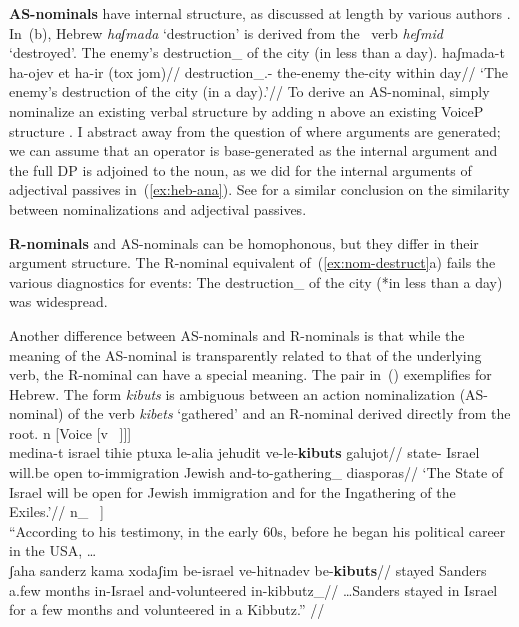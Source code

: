 \textbf{AS-nominals} have internal structure, as discussed at length by various authors \citep{chomsky70,grimshaw90,marantz97,harley09n,alexiadou10b,borer13oup}. In~(\nextx b), Hebrew \emph{haʃmada} `destruction' is derived from the \thif~verb \emph{heʃmid} `destroyed'.
\pex\label{ex:nom-destruct}
	\a The enemy's destruction_{} of the city (in less than a day).
	\a \begingl
		\gla haʃmada-t ha-ojev et ha-ir (tox jom)//
		\glb destruction_{}.- the-enemy  the-city within day//
		\glft `The enemy's destruction of the city (in a day).'//
	\endgl
\xe
To derive an AS-nominal, simply nominalize an existing verbal structure by adding n above an existing VoiceP structure \citep{hazout95,engelhardt00}. I abstract away from the question of where arguments are generated; we can assume that an operator is base-generated as the internal argument and the full DP is adjoined to the noun, as we did for the internal arguments of adjectival passives in~(\ref{ex:heb-ana}). See \citet[559]{borer13oup} for a similar conclusion on the similarity between nominalizations and adjectival passives.
\\
\xe

\textbf{R-nominals} and AS-nominals can be homophonous, but they differ in their argument structure. The R-nominal equivalent of~(\ref{ex:nom-destruct}a) fails the various diagnostics for events:
\ex The destruction_{} of the city (*in less than a day) was widespread.
\xe

Another difference between AS-nominals and R-nominals is that while the meaning of the AS-nominal is transparently related to that of the underlying verb, the R-nominal can have a special meaning. The pair in~(\nextx) exemplifies for Hebrew. The form \emph{kibuts} is ambiguous between an action nominalization (AS-nominal) of the verb \emph{kibets} `gathered' and an R-nominal derived directly from the root.
\pex
	\a {[}n [Voice {\va} [v ~\!]]]\\
	\begingl
		\gla medina-t israel tihie ptuxa le-alia jehudit ve-le-\textbf{kibuts} galujot//
		\glb state- Israel will.be open to-immigration Jewish and-to-gathering_{} diasporas//
		\glft `The State of Israel will be open for Jewish immigration and for the Ingathering of the Exiles.'//
	\endgl
	\a {[}n_{} ~\!]\\
		``According to his testimony, in the early 60s, before he began his political career in the USA, \dots\\
	\begingl
		\gla ʃaha sanderz kama xodaʃim be-israel ve-hitnadev be-\textbf{kibuts}//
		\glb stayed Sanders a.few months in-Israel and-volunteered in-kibbutz_{}//
		\glft \dots Sanders stayed in Israel for a few months and volunteered in a Kibbutz.''	//
	\endgl
\xe

